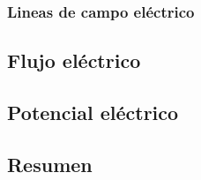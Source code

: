 

\subsubsection{Lineas de campo eléctrico}



\subsection{Flujo eléctrico}



\subsection{Potencial eléctrico}



\subsection{Resumen}

